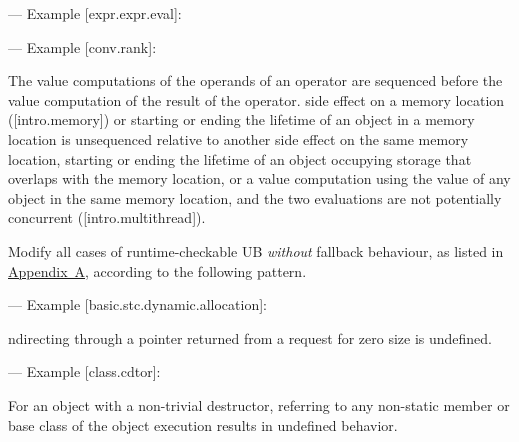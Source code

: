 --- Example [expr.expr.eval]:

\begin{adjustwidth}{0.5cm}{0.5cm}
\end{adjustwidth}

--- Example [conv.rank]:

\begin{adjustwidth}{0.5cm}{0.5cm}
The value computations of the operands of an operator are sequenced before the value computation of the result of the operator.   side effect on a memory location ([intro.memory]) or starting or ending the lifetime of an object in a memory location is unsequenced relative to another side effect on the same memory location, starting or ending the lifetime of an object occupying storage that overlaps with the memory location, or a value computation using the value of any object in the same memory location, and the two evaluations are not potentially concurrent ([intro.multithread]).
\end{adjustwidth}

Modify all cases of runtime-checkable UB \emph{without} fallback behaviour, as listed in \hyperref[appendix]{Appendix~A}, according to the following pattern. 

--- Example [basic.stc.dynamic.allocation]:

\begin{adjustwidth}{0.5cm}{0.5cm}
ndirecting through a pointer  returned from a request for zero size is undefined.
\end{adjustwidth}

--- Example [class.cdtor]:

\begin{adjustwidth}{0.5cm}{0.5cm}
For an object with a non-trivial destructor, referring to any non-static member or base class of the object  execution results in undefined behavior.
\end{adjustwidth}

